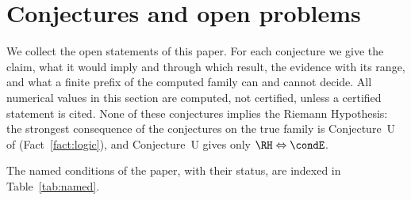 \section{Conjectures and open problems}\label{sec:conjectures}

We collect the open statements of this paper. For each conjecture we give the claim, what it would imply and through
which result, the evidence with its range, and what a finite prefix of the computed family can and cannot decide. All numerical values in
this section are computed, not certified, unless a certified statement is cited. None of these conjectures implies the
Riemann Hypothesis: the strongest consequence of the conjectures on the true family is Conjecture~U of \cite{PaperI}
(Fact~\ref{fact:logic}), and Conjecture~U gives only $\RH\Leftrightarrow\condE$.

The named conditions of the paper, with their status, are indexed in Table~\ref{tab:named}.

